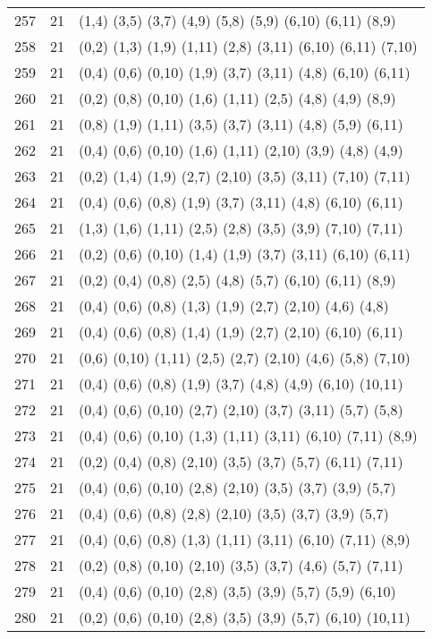 {\begin{longtable}{lll}
257 & 21 & (1,4) (3,5) (3,7) (4,9) (5,8) (5,9) (6,10) (6,11) (8,9) \\
258 & 21 & (0,2) (1,3) (1,9) (1,11) (2,8) (3,11) (6,10) (6,11) (7,10) \\
259 & 21 & (0,4) (0,6) (0,10) (1,9) (3,7) (3,11) (4,8) (6,10) (6,11) \\
260 & 21 & (0,2) (0,8) (0,10) (1,6) (1,11) (2,5) (4,8) (4,9) (8,9) \\
261 & 21 & (0,8) (1,9) (1,11) (3,5) (3,7) (3,11) (4,8) (5,9) (6,11) \\
262 & 21 & (0,4) (0,6) (0,10) (1,6) (1,11) (2,10) (3,9) (4,8) (4,9) \\
263 & 21 & (0,2) (1,4) (1,9) (2,7) (2,10) (3,5) (3,11) (7,10) (7,11) \\
264 & 21 & (0,4) (0,6) (0,8) (1,9) (3,7) (3,11) (4,8) (6,10) (6,11) \\
265 & 21 & (1,3) (1,6) (1,11) (2,5) (2,8) (3,5) (3,9) (7,10) (7,11) \\
266 & 21 & (0,2) (0,6) (0,10) (1,4) (1,9) (3,7) (3,11) (6,10) (6,11) \\
267 & 21 & (0,2) (0,4) (0,8) (2,5) (4,8) (5,7) (6,10) (6,11) (8,9) \\
268 & 21 & (0,4) (0,6) (0,8) (1,3) (1,9) (2,7) (2,10) (4,6) (4,8) \\
269 & 21 & (0,4) (0,6) (0,8) (1,4) (1,9) (2,7) (2,10) (6,10) (6,11) \\
270 & 21 & (0,6) (0,10) (1,11) (2,5) (2,7) (2,10) (4,6) (5,8) (7,10) \\
271 & 21 & (0,4) (0,6) (0,8) (1,9) (3,7) (4,8) (4,9) (6,10) (10,11) \\
272 & 21 & (0,4) (0,6) (0,10) (2,7) (2,10) (3,7) (3,11) (5,7) (5,8) \\
273 & 21 & (0,4) (0,6) (0,10) (1,3) (1,11) (3,11) (6,10) (7,11) (8,9) \\
274 & 21 & (0,2) (0,4) (0,8) (2,10) (3,5) (3,7) (5,7) (6,11) (7,11) \\
275 & 21 & (0,4) (0,6) (0,10) (2,8) (2,10) (3,5) (3,7) (3,9) (5,7) \\
276 & 21 & (0,4) (0,6) (0,8) (2,8) (2,10) (3,5) (3,7) (3,9) (5,7) \\
277 & 21 & (0,4) (0,6) (0,8) (1,3) (1,11) (3,11) (6,10) (7,11) (8,9) \\
278 & 21 & (0,2) (0,8) (0,10) (2,10) (3,5) (3,7) (4,6) (5,7) (7,11) \\
279 & 21 & (0,4) (0,6) (0,10) (2,8) (3,5) (3,9) (5,7) (5,9) (6,10) \\
280 & 21 & (0,2) (0,6) (0,10) (2,8) (3,5) (3,9) (5,7) (6,10) (10,11) \\

\end{longtable}}
